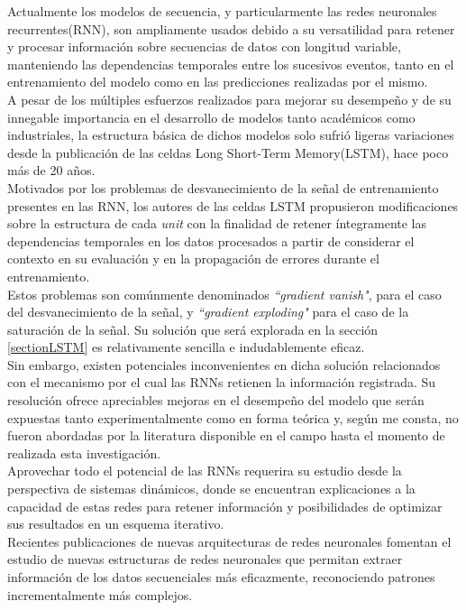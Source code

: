 \documentclass{article}
\begin{document}
	
	Actualmente los modelos de secuencia, y particularmente las redes neuronales recurrentes(RNN), son ampliamente usados debido a su versatilidad para retener y procesar información sobre secuencias de datos con longitud variable, manteniendo las dependencias temporales entre los sucesivos eventos, tanto en el entrenamiento del modelo como en las predicciones realizadas por el mismo.\\
	A pesar de los múltiples esfuerzos realizados para mejorar su desempeño\cite{16ForgateGatePeepholeConnectionsGers} y de su innegable importancia en el desarrollo de modelos tanto académicos\cite{15TransductionGraves, 43ParsingScenesRecursively, 44SpeechRecognition, 52MachineTranslationAttentionRNN} como industriales\cite{12DeepSearch, 13SpeechRecognition, 14RegularizationZaremba, 51SequenceToSequenceMachineTranslation, 56MicrosoftSpeechRecognition}, la estructura básica de dichos modelos solo sufrió ligeras variaciones desde la publicación de las celdas Long Short-Term Memory(LSTM), hace poco más de 20 años\cite{42FormerLSTMHochreiter}. \\
	Motivados por los problemas de desvanecimiento de la señal de entrenamiento presentes en las RNN, los autores de las celdas LSTM propusieron modificaciones sobre la estructura de cada \textit{unit} con la finalidad de retener íntegramente las dependencias temporales en los datos procesados a partir de considerar el contexto en su evaluación y en la propagación de errores durante el entrenamiento\cite{42FormerLSTMHochreiter}.\\
	Estos problemas son comúnmente denominados \textit{``gradient vanish"}, para el caso del desvanecimiento de la señal, y  \textit{``gradient exploding"} para el caso de la saturación de la señal. Su solución que será explorada en la sección \ref{sectionLSTM} es relativamente sencilla e indudablemente eficaz.\\
	
	Sin embargo, existen potenciales inconvenientes en dicha solución relacionados con el mecanismo por el cual las RNNs retienen la información registrada. Su resolución ofrece apreciables mejoras en el desempeño del modelo que serán expuestas tanto experimentalmente como en forma teórica y, según me consta, no fueron abordadas por la literatura disponible en el campo hasta el momento de realizada esta investigación.\\
	Aprovechar todo el potencial de las RNNs requerira su estudio desde la perspectiva de sistemas dinámicos, donde se encuentran explicaciones a la capacidad de estas redes para retener información y posibilidades de optimizar sus resultados en un esquema iterativo.\\
	Recientes publicaciones de nuevas arquitecturas de redes neuronales \cite{1GANs, 18DifferentiableNeuralComputer} fomentan el estudio de nuevas estructuras de redes neuronales que permitan extraer información de los datos secuenciales más eficazmente, reconociendo patrones incrementalmente más complejos.\\
	
\end{document}
